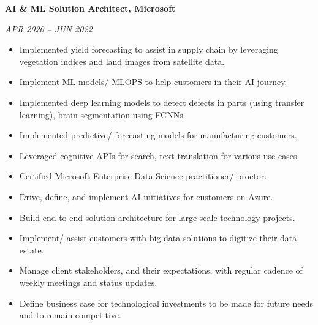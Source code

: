 \documentclass[10pt, a4paper]{article}
\begin{document}
\begin{paracol}{2}
{\bfseries AI \& ML Solution Architect, Microsoft}\par
\vspace{0.5ex} %
{\color{dategray}\itshape\MakeUppercase{Apr 2020 – Jun 2022}}
\vspace{1.0ex} %
\begin{itemize}
    \item Implemented yield forecasting to assist in supply chain by leveraging vegetation indices and land images from satellite data.
    \item Implement ML models/ MLOPS to help customers in their AI journey.
    \item Implemented deep learning models to detect defects in parts (using transfer learning), brain segmentation using FCNNs.
    \item Implemented predictive/ forecasting models for manufacturing customers.
    \item Leveraged cognitive APIs for search, text translation for various use cases.
    \item Certified Microsoft Enterprise Data Science practitioner/ proctor.
    \item Drive, define, and implement AI initiatives for customers on Azure.
    \item Build end to end solution architecture for large scale technology projects.
    \item Implement/ assist customers with big data solutions to digitize their data estate.
    \item Manage client stakeholders, and their expectations, with regular cadence of weekly meetings and status updates.
    \item Define business case for technological investments to be made for future needs and to remain competitive.
\end{itemize}
\vspace{1.2\baselineskip} %


\end{paracol}
\end{document}
